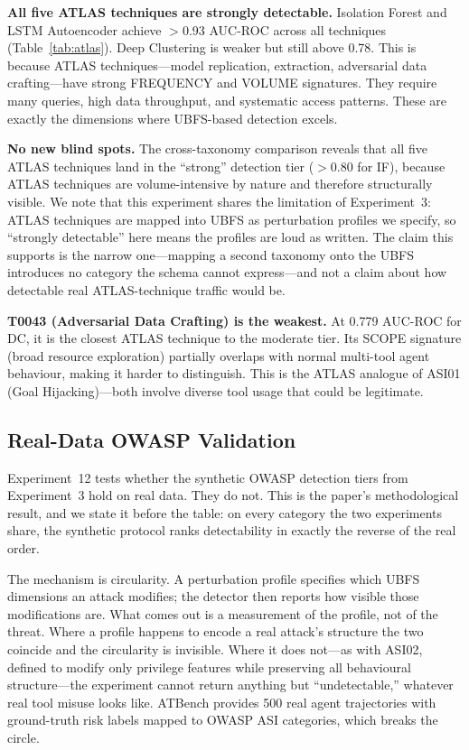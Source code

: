 \documentclass[conference]{IEEEtran}
\begin{document}
\textbf{All five ATLAS techniques are strongly detectable.} Isolation Forest and LSTM Autoencoder achieve $>$0.93 AUC-ROC across all techniques (Table~\ref{tab:atlas}). Deep Clustering is weaker but still above 0.78. This is because ATLAS techniques---model replication, extraction, adversarial data crafting---have strong FREQUENCY and VOLUME signatures. They require many queries, high data throughput, and systematic access patterns. These are exactly the dimensions where UBFS-based detection excels.

\textbf{No new blind spots.} The cross-taxonomy comparison reveals that all five ATLAS techniques land in the ``strong'' detection tier ($>$0.80 for IF), because ATLAS techniques are volume-intensive by nature and therefore structurally visible. We note that this experiment shares the limitation of Experiment~3: ATLAS techniques are mapped into UBFS as perturbation profiles we specify, so ``strongly detectable'' here means the profiles are loud as written. The claim this supports is the narrow one---mapping a second taxonomy onto the UBFS introduces no category the schema cannot express---and not a claim about how detectable real ATLAS-technique traffic would be.

\textbf{T0043 (Adversarial Data Crafting) is the weakest.} At 0.779 AUC-ROC for DC, it is the closest ATLAS technique to the moderate tier. Its SCOPE signature (broad resource exploration) partially overlaps with normal multi-tool agent behaviour, making it harder to distinguish. This is the ATLAS analogue of ASI01 (Goal Hijacking)---both involve diverse tool usage that could be legitimate.

\subsection{Real-Data OWASP Validation}
\label{sec:real_owasp}

Experiment~12 tests whether the synthetic OWASP detection tiers from Experiment~3 hold on real data. They do not. This is the paper's methodological result, and we state it before the table: on every category the two experiments share, the synthetic protocol ranks detectability in exactly the reverse of the real order.

The mechanism is circularity. A perturbation profile specifies which UBFS dimensions an attack modifies; the detector then reports how visible those modifications are. What comes out is a measurement of the profile, not of the threat. Where a profile happens to encode a real attack's structure the two coincide and the circularity is invisible. Where it does not---as with ASI02, defined to modify only privilege features while preserving all behavioural structure---the experiment cannot return anything but ``undetectable,'' whatever real tool misuse looks like. ATBench provides 500 real agent trajectories with ground-truth risk labels mapped to OWASP ASI categories, which breaks the circle.
\end{document}
